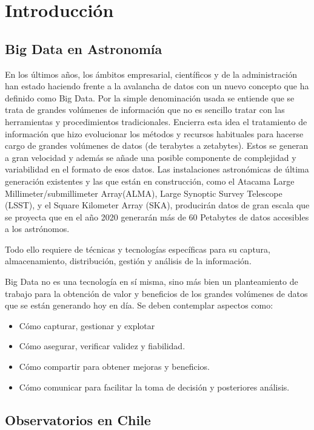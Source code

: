 \section{Introducción}

\subsection{Big Data en Astronomía}

En los últimos años, los ámbitos empresarial, científicos y de la administración
han estado haciendo frente a la avalancha de datos con un nuevo concepto que ha
definido como Big Data. Por la simple denominación usada se entiende que se trata
de grandes volúmenes de información que no es sencillo tratar con las herramientas
y procedimientos tradicionales. Encierra esta idea el tratamiento de información
que hizo evolucionar los métodos y recursos habituales para hacerse cargo de grandes
volúmenes de datos (de terabytes a zetabytes). Estos se generan a gran
velocidad y además se añade una posible componente de complejidad y variabilidad en
el formato de esos datos. Las instalaciones astronómicas de última generación
existentes y las que están en construcción, como el Atacama Large
Millimeter/submillimeter Array(ALMA), Large Synoptic Survey Telescope (LSST), y el
Square Kilometer Array (SKA), producirán datos de gran escala que se proyecta que
en el año 2020 generarán más de 60 Petabytes de datos accesibles a los astrónomos.

Todo ello requiere de técnicas y tecnologías específicas para su captura,
almacenamiento, distribución, gestión y análisis de la información.

Big Data no es una tecnología en sí misma, sino más bien un planteamiento de
trabajo para la obtención de valor y beneficios de los grandes volúmenes de
datos que se están generando hoy en día. Se deben contemplar aspectos como:

\begin{itemize}
    \item Cómo capturar, gestionar y explotar
    \item Cómo asegurar, verificar validez y fiabilidad.
    \item Cómo compartir para obtener mejoras y beneficios.
    \item Cómo comunicar para facilitar la toma de decisión y posteriores análisis.
\end{itemize}

\subsection{Observatorios en Chile}

